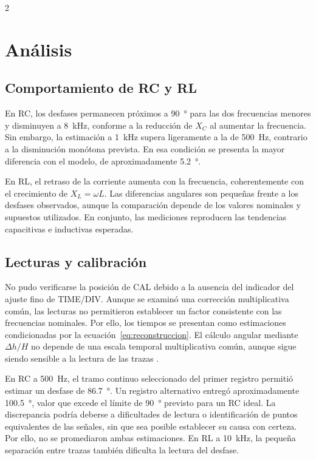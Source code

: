 \documentclass[10pt,letterpaper]{article}
\begin{document}
\begin{multicols}{2}
\raggedcolumns

\section{Análisis}

\subsection{Comportamiento de RC y RL}

En RC, los desfases permanecen próximos a \SI{90}{\degree} para las dos frecuencias menores y disminuyen a \SI{8}{\kilo\hertz}, conforme a la reducción de $X_C$ al aumentar la frecuencia. Sin embargo, la estimación a \SI{1}{\kilo\hertz} supera ligeramente a la de \SI{500}{\hertz}, contrario a la disminución monótona prevista. En esa condición se presenta la mayor diferencia con el modelo, de aproximadamente \SI{5.2}{\degree}.

En RL, el retraso de la corriente aumenta con la frecuencia, coherentemente con el crecimiento de $X_L=\omega L$. Las diferencias angulares son pequeñas frente a los desfases observados, aunque la comparación depende de los valores nominales y supuestos utilizados. En conjunto, las mediciones reproducen las tendencias capacitivas e inductivas esperadas.

\subsection{Lecturas y calibración}

No pudo verificarse la posición de CAL debido a la ausencia del indicador del ajuste fino de TIME/DIV. Aunque se examinó una corrección multiplicativa común, las lecturas no permitieron establecer un factor consistente con las frecuencias nominales. Por ello, los tiempos se presentan como estimaciones condicionadas por la ecuación~\eqref{eq:reconstruccion}. El cálculo angular mediante $\Delta h/H$ no depende de una escala temporal multiplicativa común, aunque sigue siendo sensible a la lectura de las trazas \cite{manualhameg}.

En RC a \SI{500}{\hertz}, el tramo continuo seleccionado del primer registro permitió estimar un desfase de \SI{86.7}{\degree}. Un registro alternativo entregó aproximadamente \SI{100.5}{\degree}, valor que excede el límite de \SI{90}{\degree} previsto para un RC ideal. La discrepancia podría deberse a dificultades de lectura o identificación de puntos equivalentes de las señales, sin que sea posible establecer su causa con certeza. Por ello, no se promediaron ambas estimaciones. En RL a \SI{10}{\kilo\hertz}, la pequeña separación entre trazas también dificulta la lectura del desfase.


\end{multicols}
\end{document}
